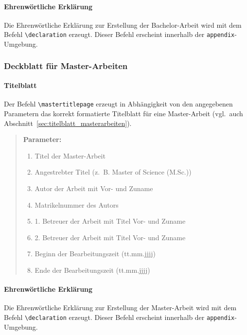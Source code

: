 \documentclass[english, trackchanges, hyperref, ngerman ,pdf, mp, mppdf]{wise}
\newcommand\code[1]{\texttt{#1}}
\newcommand\command[1]{\code{\textbackslash{}#1}}
\begin{document}
\paragraph{Ehrenwörtliche Erklärung}

Die Ehrenwörtliche Erklärung zur Erstellung der Bachelor-Arbeit wird
mit dem Befehl \command{declaration} erzeugt. Dieser
Befehl erscheint innerhalb der \code{appendix}-Umgebung.

\subsubsection{Deckblatt für Master-Arbeiten}


\paragraph{Titelblatt}

Der Befehl \command{mastertitlepage} erzeugt in Abhängigkeit
von den angegebenen Parametern das korrekt formatierte Titelblatt
für eine Master-Arbeit (vgl.\ auch Abschnitt~\ref{sec:titelblatt_masterarbeiten}).

\begin{quotation}
\noindent \textbf{Parameter:}
\begin{enumerate}
\item Titel der Master-Arbeit
\item Angestrebter Titel (z.~B. Master of Science (M.Sc.))
\item Autor der Arbeit mit Vor- und Zuname
\item Matrikelnummer des Autors
\item 1. Betreuer der Arbeit mit Titel Vor- und Zuname
\item 2. Betreuer der Arbeit mit Titel Vor- und Zuname
\item Beginn der Bearbeitungszeit (tt.mm.jjjj)
\item Ende der Bearbeitungszeit (tt.mm.jjjj)
\end{enumerate}
\end{quotation}

\paragraph{Ehrenwörtliche Erklärung}

Die Ehrenwörtliche Erklärung zur Erstellung der Master-Arbeit wird
mit dem Befehl \command{declaration} erzeugt. Dieser
Befehl erscheint innerhalb der \code{appendix}-Umgebung.
\end{document}
